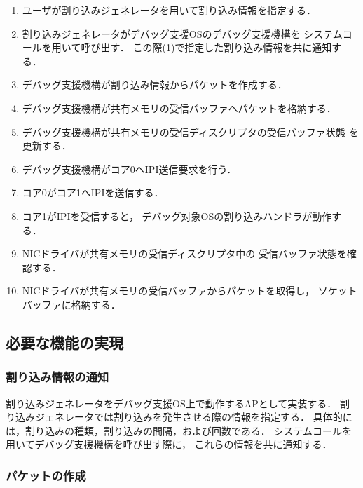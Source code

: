 \documentclass[submit,techreq,noauthor,dvipdfmx]{ipsj}
\begin{document}
\begin{enumerate}
    \item
        ユーザが割り込みジェネレータを用いて割り込み情報を指定する．
    \item 
        割り込みジェネレータがデバッグ支援OSのデバッグ支援機構を
        システムコールを用いて呼び出す．
        この際(1)で指定した割り込み情報を共に通知する．
    \item 
        デバッグ支援機構が割り込み情報からパケットを作成する．
    \item 
        デバッグ支援機構が共有メモリの受信バッファへパケットを格納する．
    \item 
        デバッグ支援機構が共有メモリの受信ディスクリプタの受信バッファ状態
        を更新する．
    \item
        デバッグ支援機構がコア0へIPI送信要求を行う．
    \item
        コア0がコア1へIPIを送信する．
    \item 
        コア1がIPIを受信すると，
        デバッグ対象OSの割り込みハンドラが動作する．
    \item 
        NICドライバが共有メモリの受信ディスクリプタ中の
        受信バッファ状態を確認する．
    \item 
        NICドライバが共有メモリの受信バッファからパケットを取得し，
        ソケットバッファに格納する．
\end{enumerate}

\subsection{必要な機能の実現}\label{sec:realization_of_needed_function}

\subsubsection{割り込み情報の通知}\label{sec:notification_of_interrupt_information}

割り込みジェネレータをデバッグ支援OS上で動作するAPとして実装する．
割り込みジェネレータでは割り込みを発生させる際の情報を指定する．
具体的には，割り込みの種類，割り込みの間隔，および回数である．
システムコールを用いてデバッグ支援機構を呼び出す際に，
これらの情報を共に通知する．

\subsubsection{パケットの作成}\label{sec:creating_of_packet}
\end{document}
